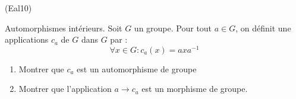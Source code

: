 \begin{tiny}(Eal10)\end{tiny} Automorphismes intérieurs.\newline
Soit $G$ un groupe. Pour tout $a\in G$, on définit une applications $c_a$ de $G$ dans $G$ par :
\begin{displaymath}
 \forall x\in G : c_a(x)=axa^{-1}
\end{displaymath}
\begin{enumerate}
 \item Montrer que $c_a$ est un automorphisme de groupe 
 \item Montrer que l'application   $a \rightarrow c_a$ est un morphisme de groupe.
\end{enumerate}